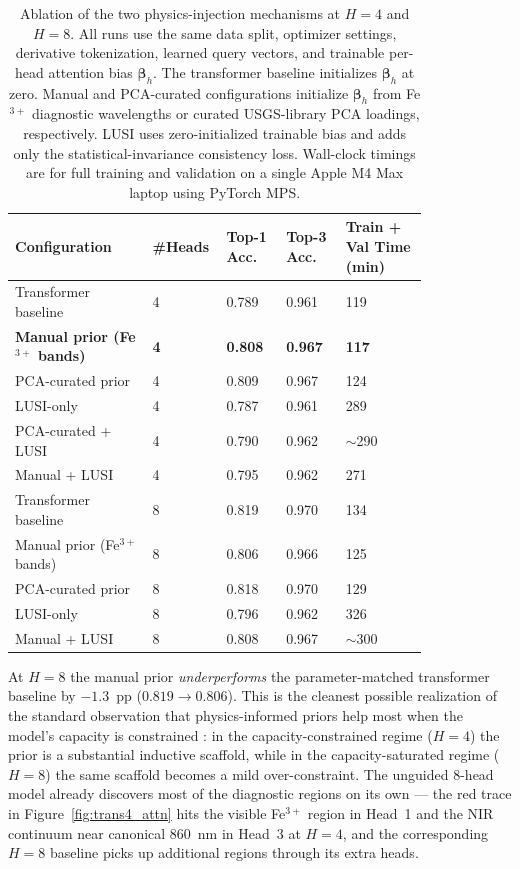 \documentclass[preprint,12pt]{elsarticle}
\begin{document}
\begin{table}[!htbp]
\centering
\small
\caption{Ablation of the two physics-injection mechanisms at $H=4$ and $H=8$.
All runs use the same data split, optimizer settings, derivative tokenization, learned query vectors, and trainable per-head attention bias $\bm{\beta}_h$.
The transformer baseline initializes $\bm{\beta}_h$ at zero.
Manual and PCA-curated configurations initialize $\bm{\beta}_h$ from Fe$^{3+}$ diagnostic wavelengths or curated USGS-library PCA loadings, respectively.
LUSI uses zero-initialized trainable bias and adds only the statistical-invariance consistency loss.
Wall-clock timings are for full training and validation on a single Apple M4 Max laptop using PyTorch MPS.}
\label{tab:ablation}
\begin{tabular}{p{0.30\linewidth}p{0.08\linewidth}p{0.13\linewidth}p{0.13\linewidth}p{0.18\linewidth}}
\hline
\rowcolor[gray]{0.85}
\textbf{Configuration} & \textbf{\#Heads} & \textbf{Top-1 Acc.} & \textbf{Top-3 Acc.} & \textbf{Train + Val Time (min)} \\
\hline
Transformer baseline & 4 & 0.789 & 0.961 & 119 \\
\hline
\textbf{Manual prior (Fe$^{3+}$ bands)} & \textbf{4} & \textbf{0.808} & \textbf{0.967} & \textbf{117} \\
\hline
PCA-curated prior & 4 & 0.809 & 0.967 & 124 \\
\hline
LUSI-only & 4 & 0.787 & 0.961 & 289 \\
\hline
PCA-curated + LUSI & 4 & 0.790 & 0.962 & $\sim$290 \\
\hline
Manual + LUSI & 4 & 0.795 & 0.962 & 271 \\
\hline
Transformer baseline & 8 & 0.819 & 0.970 & 134 \\
\hline
Manual prior (Fe$^{3+}$ bands) & 8 & 0.806 & 0.966 & 125 \\
\hline
PCA-curated prior & 8 & 0.818 & 0.970 & 129 \\
\hline
LUSI-only & 8 & 0.796 & 0.962 & 326 \\
\hline
Manual + LUSI & 8 & 0.808 & 0.967 & $\sim$300 \\
\hline
\end{tabular}
\end{table}
At $H = 8$ the manual prior \emph{underperforms} the parameter-matched transformer baseline by $-1.3$~pp ($0.819 \to 0.806$). This is the cleanest possible realization of the standard observation that physics-informed priors help most when the model's capacity is constrained \cite{raissi2019pinn, karpatne2017tgds}: in the capacity-constrained regime ($H = 4$) the prior is a substantial inductive scaffold, while in the capacity-saturated regime ($H = 8$) the same scaffold becomes a mild over-constraint. The unguided 8-head model already discovers most of the diagnostic regions on its own --- the red trace in Figure~\ref{fig:trans4_attn} hits the visible Fe$^{3+}$ region in Head~1 and the NIR continuum near canonical 860~nm in Head~3 at $H = 4$, and the corresponding $H = 8$ baseline picks up additional regions through its extra heads.
\end{document}
